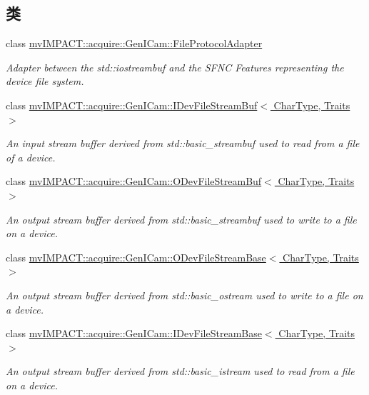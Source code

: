 \subsection*{类}
\begin{DoxyCompactItemize}
\item 
class \hyperlink{classmv_i_m_p_a_c_t_1_1acquire_1_1_gen_i_cam_1_1_file_protocol_adapter}{mv\+I\+M\+P\+A\+C\+T\+::acquire\+::\+Gen\+I\+Cam\+::\+File\+Protocol\+Adapter}
\begin{DoxyCompactList}\small\item\em Adapter between the std\+::iostreambuf and the S\+F\+N\+C Features representing the device file system. \end{DoxyCompactList}\item 
class \hyperlink{classmv_i_m_p_a_c_t_1_1acquire_1_1_gen_i_cam_1_1_i_dev_file_stream_buf}{mv\+I\+M\+P\+A\+C\+T\+::acquire\+::\+Gen\+I\+Cam\+::\+I\+Dev\+File\+Stream\+Buf$<$ Char\+Type, Traits $>$}
\begin{DoxyCompactList}\small\item\em An input stream buffer derived from std\+::basic\+\_\+streambuf used to read from a file of a device. \end{DoxyCompactList}\item 
class \hyperlink{classmv_i_m_p_a_c_t_1_1acquire_1_1_gen_i_cam_1_1_o_dev_file_stream_buf}{mv\+I\+M\+P\+A\+C\+T\+::acquire\+::\+Gen\+I\+Cam\+::\+O\+Dev\+File\+Stream\+Buf$<$ Char\+Type, Traits $>$}
\begin{DoxyCompactList}\small\item\em An output stream buffer derived from std\+::basic\+\_\+streambuf used to write to a file on a device. \end{DoxyCompactList}\item 
class \hyperlink{classmv_i_m_p_a_c_t_1_1acquire_1_1_gen_i_cam_1_1_o_dev_file_stream_base}{mv\+I\+M\+P\+A\+C\+T\+::acquire\+::\+Gen\+I\+Cam\+::\+O\+Dev\+File\+Stream\+Base$<$ Char\+Type, Traits $>$}
\begin{DoxyCompactList}\small\item\em An output stream buffer derived from std\+::basic\+\_\+ostream used to write to a file on a device. \end{DoxyCompactList}\item 
class \hyperlink{classmv_i_m_p_a_c_t_1_1acquire_1_1_gen_i_cam_1_1_i_dev_file_stream_base}{mv\+I\+M\+P\+A\+C\+T\+::acquire\+::\+Gen\+I\+Cam\+::\+I\+Dev\+File\+Stream\+Base$<$ Char\+Type, Traits $>$}
\begin{DoxyCompactList}\small\item\em An output stream buffer derived from std\+::basic\+\_\+istream used to read from a file on a device. \end{DoxyCompactList}\end{DoxyCompactItemize}

